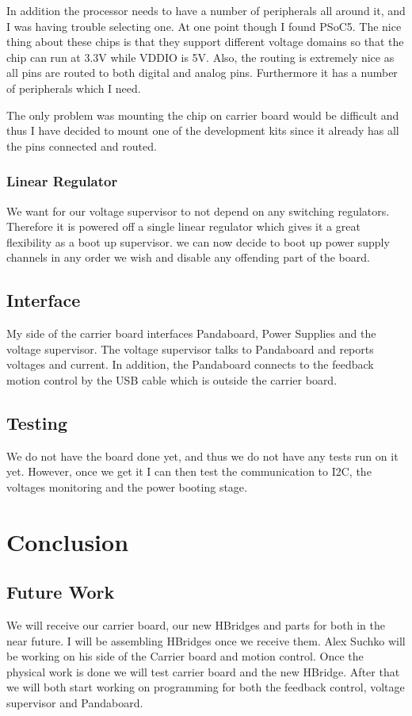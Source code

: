 \documentclass[12pt]{article}
\begin{document}
In addition the processor needs to have a number of peripherals all around it, and I was having trouble selecting one. At one point though I found PSoC5. The nice thing about these chips is that they support different voltage domains so that the chip can run at 3.3V while VDDIO is 5V. Also, the routing is extremely nice as all pins are routed to both digital and analog pins.  Furthermore it has a number of peripherals which I need.

The only problem was mounting the chip on carrier board would be difficult and thus I have decided to mount one of the development kits since it already has all the pins connected and routed. 
\subsubsection{Linear Regulator}
We want for our voltage supervisor to not depend on any switching regulators. Therefore it is powered off a single linear regulator which gives it a great flexibility as a boot up supervisor. we can now decide to boot up power supply channels in any order we wish and disable any offending part of the board.
\subsection{Interface}
My side of the carrier board interfaces Pandaboard, Power Supplies and the voltage supervisor. The voltage supervisor talks to Pandaboard and reports voltages and current. In addition, the Pandaboard connects to the feedback motion control by the USB cable which is outside the carrier board.
\subsection{Testing}
We do not have the board done yet, and thus we do not have any tests run on it yet. However, once we get it I can then test the communication to I2C, the voltages monitoring and the power booting stage.
\section{Conclusion}
\subsection{Future Work}
We will receive our carrier board, our new HBridges and parts for both in the near future. I will be assembling HBridges once we receive them. Alex Suchko will be working on his side of the Carrier board and motion control. Once the physical work is done we will test carrier board and the new HBridge. After that we will both start working on programming for both the feedback control, voltage supervisor and Pandaboard.
\end{document}
